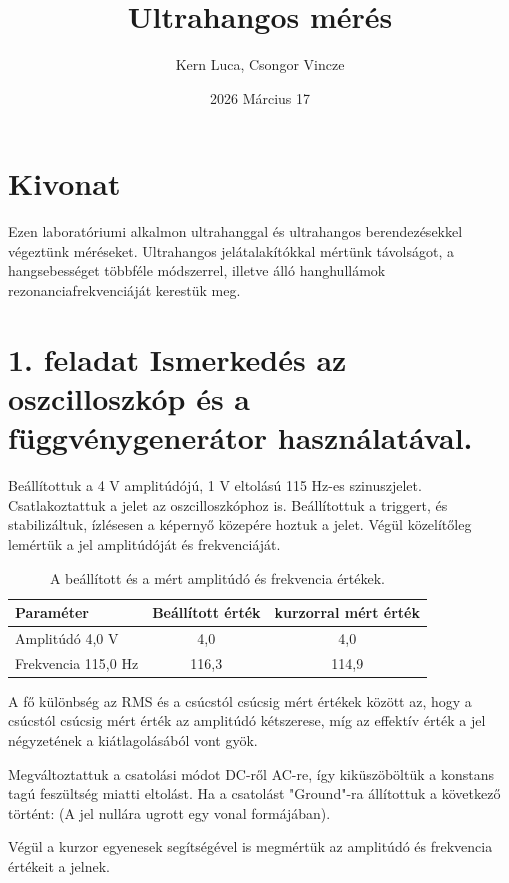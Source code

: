 \documentclass{article}
\title{Ultrahangos mérés}
\author{Kern Luca, Csongor Vincze}
\date{2026 Március 17}
\begin{document}
\maketitle

\section*{Kivonat}

Ezen laboratóriumi alkalmon ultrahanggal és ultrahangos berendezésekkel végeztünk méréseket. Ultrahangos jelátalakítókkal mértünk távolságot, a hangsebességet többféle módszerrel, illetve álló hanghullámok rezonanciafrekvenciáját kerestük meg.

\section*{1. feladat Ismerkedés az oszcilloszkóp és a függvénygenerátor használatával.}

Beállítottuk a 4 V amplitúdójú, 1 V eltolású 115 Hz-es szinuszjelet. Csatlakoztattuk a jelet az oszcilloszkóphoz is. Beállítottuk a triggert, és stabilizáltuk, ízlésesen a képernyő közepére hoztuk a jelet.
Végül közelítőleg lemértük a jel amplitúdóját és frekvenciáját.

\begin{table}[H]
    \centering
    \begin{tabular}{|l|c|c|}
        \hline
        Paraméter & Beállított érték & kurzorral mért érték \\ \hline
        Amplitúdó 4,0 V & 4,0 & 4,0 \\ \hline
        Frekvencia 115,0 Hz & 116,3 & 114,9 \\ \hline
    \end{tabular}
    \caption{A beállított és a mért amplitúdó és frekvencia értékek.}
    \label{tab:amplitudo_frekvencia}
\end{table}

A fő különbség az RMS és a csúcstól csúcsig mért értékek között az, hogy a csúcstól csúcsig mért érték az amplitúdó kétszerese, míg az effektív érték a jel négyzetének a kiátlagolásából vont gyök.

Megváltoztattuk a csatolási módot DC-ről AC-re, így kiküszöböltük a konstans tagú feszültség miatti eltolást.
Ha a csatolást "Ground"-ra állítottuk a következő történt: (A jel nullára ugrott egy vonal formájában).

Végül a kurzor egyenesek segítségével is megmértük az amplitúdó és frekvencia értékeit a jelnek.
\end{document}
